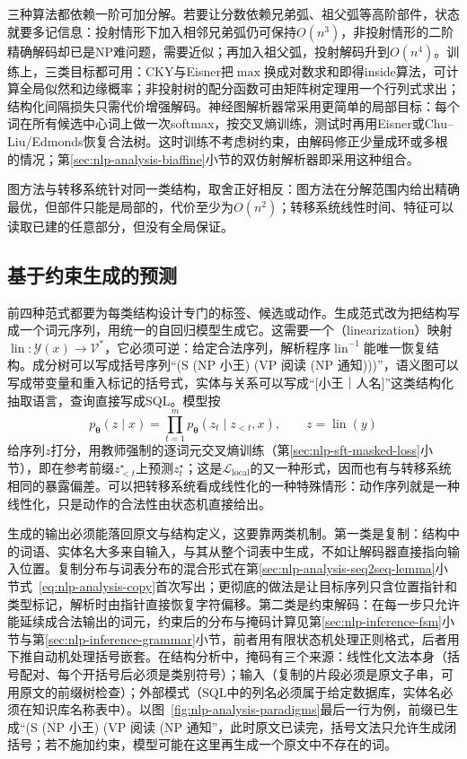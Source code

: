 三种算法都依赖一阶可加分解。若要让分数依赖兄弟弧、祖父弧等高阶部件，状态就要多记信息：投射情形下加入相邻兄弟弧仍可保持$O(n^3)$，非投射情形的二阶精确解码却已是NP难问题，需要近似；再加入祖父弧，投射解码升到$O(n^4)$。训练上，三类目标都可用：CKY与Eisner把$\max$换成对数求和即得inside算法，可计算全局似然和边缘概率；非投射树的配分函数可由矩阵树定理用一个行列式求出；结构化间隔损失只需代价增强解码。神经图解析器常采用更简单的局部目标：每个词在所有候选中心词上做一次softmax，按交叉熵训练，测试时再用Eisner或Chu–Liu/Edmonds恢复合法树。这时训练不考虑树约束，由解码修正少量成环或多根的情况；第\ref{sec:nlp-analysis-biaffine}小节的双仿射解析器即采用这种组合。

图方法与转移系统针对同一类结构，取舍正好相反：图方法在分解范围内给出精确最优，但部件只能是局部的，代价至少为$O(n^2)$；转移系统线性时间、特征可以读取已建的任意部分，但没有全局保证。

\subsection{基于约束生成的预测}
\label{sec:nlp-analysis-paradigm-generation}

前四种范式都要为每类结构设计专门的标签、候选或动作。生成范式改为把结构写成一个词元序列，用统一的自回归模型生成它。这需要一个（linearization）映射$\operatorname{lin}:\mathcal Y(x)\to\mathcal V^*$，它必须可逆：给定合法序列，解析程序$\operatorname{lin}^{-1}$能唯一恢复结构。成分树可以写成括号序列“(S (NP 小王) (VP 阅读 (NP 通知)))”，语义图可以写成带变量和重入标记的括号式，实体与关系可以写成“[小王｜人名]”这类结构化抽取语言，查询直接写成SQL。模型按
\[
  p_{\bm\theta}(z\mid x)=\prod_{t=1}^{m}p_{\bm\theta}(z_t\mid z_{<t},x),\qquad z=\operatorname{lin}(y)
\]
给序列$z$打分，用教师强制的逐词元交叉熵训练（第\ref{sec:nlp-sft-masked-loss}小节），即在参考前缀$z^\star_{<t}$上预测$z^\star_t$；这是$\mathcal L_{\mathrm{local}}$的又一种形式，因而也有与转移系统相同的暴露偏差。可以把转移系统看成线性化的一种特殊情形：动作序列就是一种线性化，只是动作的合法性由状态机直接给出。

生成的输出必须能落回原文与结构定义，这要靠两类机制。第一类是复制：结构中的词语、实体名大多来自输入，与其从整个词表中生成，不如让解码器直接指向输入位置。复制分布与词表分布的混合形式在第\ref{sec:nlp-analysis-seq2seq-lemma}小节式~\eqref{eq:nlp-analysis-copy}首次写出；更彻底的做法是让目标序列只含位置指针和类型标记，解析时由指针直接恢复字符偏移。第二类是约束解码：在每一步只允许能延续成合法输出的词元，约束后的分布与掩码计算见第\ref{sec:nlp-inference-fsm}小节与第\ref{sec:nlp-inference-grammar}小节，前者用有限状态机处理正则格式，后者用下推自动机处理括号嵌套。在结构分析中，掩码有三个来源：线性化文法本身（括号配对、每个开括号后必须是类别符号）；输入（复制的片段必须是原文子串，可用原文的前缀树检查）；外部模式（SQL中的列名必须属于给定数据库，实体名必须在知识库名称表中）。以图~\ref{fig:nlp-analysis-paradigms}最后一行为例，前缀已生成“(S (NP 小王) (VP 阅读 (NP 通知”，此时原文已读完，括号文法只允许生成闭括号；若不施加约束，模型可能在这里再生成一个原文中不存在的词。

